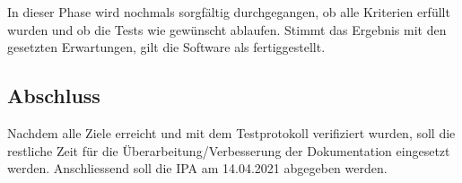 In dieser Phase wird nochmals sorgfältig durchgegangen, ob alle Kriterien erfüllt wurden und ob die Tests wie gewünscht ablaufen. Stimmt das Ergebnis mit den gesetzten Erwartungen, gilt die Software als fertiggestellt.

\subsection{Abschluss}

Nachdem alle Ziele erreicht und mit dem Testprotokoll verifiziert wurden, soll die restliche Zeit für die Überarbeitung/Verbesserung der Dokumentation eingesetzt werden. Anschliessend soll die IPA am 14.04.2021 abgegeben werden.